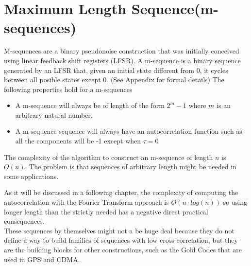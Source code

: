 \section{Maximum Length Sequence(m-sequences)}

M-sequences are a binary pseudonoise construction that was initially conceived using linear feedback shift registers (LFSR). A m-sequence is a binary sequence generated by an LFSR that, given an initial
state different from 0, it cycles between all posible states except 0. (See Appendix for formal details)
The following properties hold for a m-sequences
\begin{itemize}
\item   A m-sequence will always be of length of the form $2^{m}-1$ where $m$ is an
  arbitrary natural number.
\item A m-sequence sequence will always have an autocorrelation function such as
  all the components will be -1 except when $\tau = 0$
\end{itemize}
The complexity of the algorithm to construct an m-sequence of length $n$ is $O(n)$. The problem is
that sequences of arbitrary length might be needed in some applications.

 As it will be discussed in a following chapter, the complexity of computing the
autocorrelation with the Fourier Transform approach is $O(n \cdot log(n))$ so using longer length than the strictly needed  has a  negative direct practical consequences.\\

These sequences by themselves might not a be huge deal because they do not define a way to build families of sequences with low cross correlation, but they are the
building blocks for other constructions, such as the Gold Codes that are used in GPS and  CDMA.

